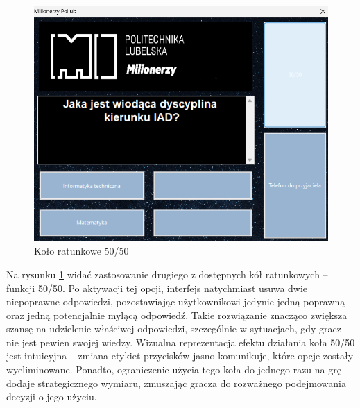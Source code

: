 \documentclass[]{article}
\begin{document}
	\begin{figure}[H]
		\centering
		\includegraphics[scale=0.3]{5.png}
		\caption{Koło ratunkowe 50/50}
		\label{rys:5}
	\end{figure}
Na rysunku \ref{rys:5} widać zastosowanie drugiego z dostępnych kół ratunkowych – funkcji 50/50. Po aktywacji tej opcji, interfejs natychmiast usuwa dwie niepoprawne odpowiedzi, pozostawiając użytkownikowi jedynie jedną poprawną oraz jedną potencjalnie mylącą odpowiedź. Takie rozwiązanie znacząco zwiększa szansę na udzielenie właściwej odpowiedzi, szczególnie w sytuacjach, gdy gracz nie jest pewien swojej wiedzy. Wizualna reprezentacja efektu działania koła 50/50 jest intuicyjna – zmiana etykiet przycisków jasno komunikuje, które opcje zostały wyeliminowane. Ponadto, ograniczenie użycia tego koła do jednego razu na grę dodaje strategicznego wymiaru, zmuszając gracza do rozważnego podejmowania decyzji o jego użyciu.
	
\end{document}
